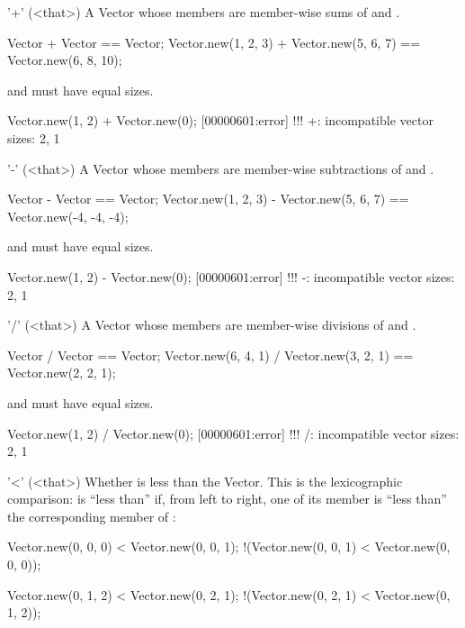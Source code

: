\begin{urbiscriptapi}
\item['+'](<that>)%
  A Vector whose members are member-wise sums of \this and \that.
\begin{urbiassert}
Vector              + Vector              == Vector;
Vector.new(1, 2, 3) + Vector.new(5, 6, 7) == Vector.new(6, 8, 10);
\end{urbiassert}
  \this and \that must have equal sizes.
\begin{urbiscript}
Vector.new(1, 2) + Vector.new(0);
[00000601:error] !!! +: incompatible vector sizes: 2, 1
\end{urbiscript}

\item['-'](<that>)%
  A Vector whose members are member-wise subtractions of \this and \that.
\begin{urbiassert}
Vector              - Vector              == Vector;
Vector.new(1, 2, 3) - Vector.new(5, 6, 7) == Vector.new(-4, -4, -4);
\end{urbiassert}
  \this and \that must have equal sizes.
\begin{urbiscript}
Vector.new(1, 2) - Vector.new(0);
[00000601:error] !!! -: incompatible vector sizes: 2, 1
\end{urbiscript}

\item['/'](<that>)%
  A Vector whose members are member-wise divisions of \this and \that.
\begin{urbiassert}
Vector              / Vector              == Vector;
Vector.new(6, 4, 1) / Vector.new(3, 2, 1) == Vector.new(2, 2, 1);
\end{urbiassert}
  \this and \that must have equal sizes.
\begin{urbiscript}
Vector.new(1, 2) / Vector.new(0);
[00000601:error] !!! /: incompatible vector sizes: 2, 1
\end{urbiscript}

\item['<'](<that>)%
  Whether \this is less than the \that Vector.  This is the lexicographic
  comparison: \this is ``less than'' \that if, from left to right, one of
  its member is ``less than'' the corresponding member of \that:

\begin{urbiassert}
   Vector.new(0, 0, 0) < Vector.new(0, 0, 1);
 !(Vector.new(0, 0, 1) < Vector.new(0, 0, 0));

   Vector.new(0, 1, 2) < Vector.new(0, 2, 1);
 !(Vector.new(0, 2, 1) < Vector.new(0, 1, 2));


\end{urbiassert}
\end{urbiscriptapi}
